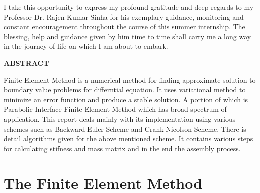 \documentclass{report}
\numberwithin{equation}{chapter}
\begin{document}
 \begin{spacing}{1.5}
 \begin{flushleft}
I take this opportunity to express my profound gratitude and deep regards to my Professor Dr. Rajen Kumar Sinha for his exemplary guidance, monitoring and constant encouragement throughout the course of this summer internship. The blessing, help and guidance given by him time to time shall carry me a long way in the journey of life on which I am about to embark. \end{flushleft}
\end{spacing}
 
 
\newpage
\begin{center}
 {\textbf{ \Large ABSTRACT\\ \bigskip}}
\end{center}
\begin{spacing}{1.5}
\begin{flushleft}
Finite Element Method is a numerical method for finding approximate solution to boundary value problems for differntial equation. It uses variational method to minimize an error function and produce a stable solution. A portion of which is Parabolic Interface Finite Element Method which has broad spectrum of application. This report deals mainly with its implementation using various schemes such as Backward Euler Scheme and Crank Nicolson Scheme. There is detail algorithms given for the above mentioned scheme. It contains various steps for calculating stifness and mass matrix and in the end the assembly process.
\end{flushleft}
\end{spacing} 


\tableofcontents
\chapter{The Finite Element Method}
\end{document}
